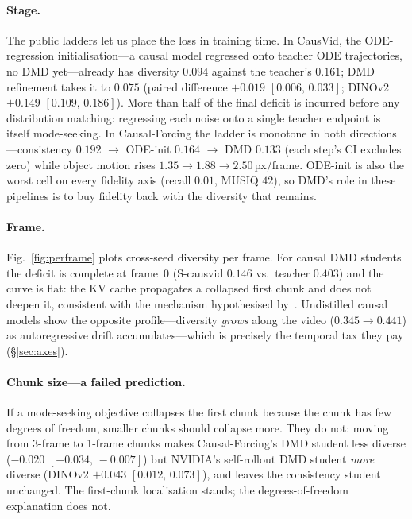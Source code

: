 \documentclass[10pt,twocolumn,letterpaper]{article}
\newcommand{\ci}[2]{[#1,\,#2]}
\begin{document}
\paragraph{Stage.} The public ladders let us place the loss in training time. In CausVid, the ODE-regression initialisation---a causal model regressed onto teacher ODE trajectories, no DMD yet---already has diversity $0.094$ against the teacher's $0.161$; DMD refinement takes it to $0.075$ (paired difference $+0.019$ $\ci{0.006}{0.033}$; DINOv2 $+0.149$ $\ci{0.109}{0.186}$). More than half of the final deficit is incurred before any distribution matching: regressing each noise onto a single teacher endpoint is itself mode-seeking. In Causal-Forcing the ladder is monotone in both directions---consistency $0.192$ $\to$ ODE-init $0.164$ $\to$ DMD $0.133$ (each step's CI excludes zero) while object motion rises $1.35\to1.88\to2.50$\,px/frame. ODE-init is also the worst cell on every fidelity axis (recall $0.01$, MUSIQ $42$), so DMD's role in these pipelines is to buy fidelity back with the diversity that remains.

\paragraph{Frame.} Fig.~\ref{fig:perframe} plots cross-seed diversity per frame. For causal DMD students the deficit is complete at frame~0 (S-causvid $0.146$ vs.\ teacher $0.403$) and the curve is flat: the KV cache propagates a collapsed first chunk and does not deepen it, consistent with the mechanism hypothesised by~\cite{uncertaintydmd}. Undistilled causal models show the opposite profile---diversity \emph{grows} along the video ($0.345\to0.441$) as autoregressive drift accumulates---which is precisely the temporal tax they pay (\S\ref{sec:axes}).

\paragraph{Chunk size---a failed prediction.} If a mode-seeking objective collapses the first chunk because the chunk has few degrees of freedom, smaller chunks should collapse more. They do not: moving from 3-frame to 1-frame chunks makes Causal-Forcing's DMD student less diverse ($-0.020$ $\ci{-0.034}{-0.007}$) but NVIDIA's self-rollout DMD student \emph{more} diverse (DINOv2 $+0.043$ $\ci{0.012}{0.073}$), and leaves the consistency student unchanged. The first-chunk localisation stands; the degrees-of-freedom explanation does not.
\end{document}
